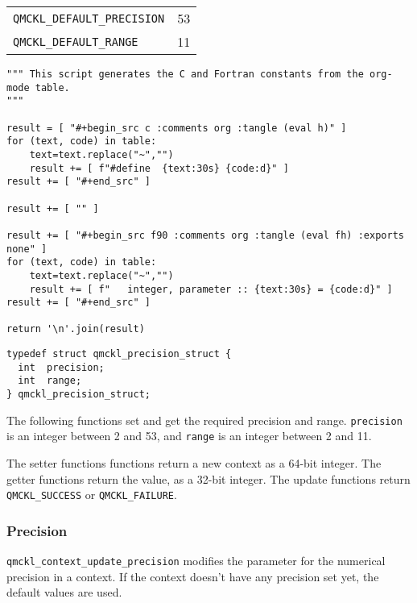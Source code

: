 \begin{table}[htbp]
\label{tab:orga45f0a8}
\centering
\begin{tabular}{lr}
\texttt{QMCKL\_DEFAULT\_PRECISION} & 53\\
\texttt{QMCKL\_DEFAULT\_RANGE} & 11\\
\end{tabular}
\end{table}

\begin{verbatim}
""" This script generates the C and Fortran constants from the org-mode table.
"""

result = [ "#+begin_src c :comments org :tangle (eval h)" ]
for (text, code) in table:
    text=text.replace("~","")
    result += [ f"#define  {text:30s} {code:d}" ]
result += [ "#+end_src" ]

result += [ "" ]

result += [ "#+begin_src f90 :comments org :tangle (eval fh) :exports none" ]
for (text, code) in table:
    text=text.replace("~","")
    result += [ f"   integer, parameter :: {text:30s} = {code:d}" ]
result += [ "#+end_src" ]

return '\n'.join(result)

\end{verbatim}

\begin{verbatim}
typedef struct qmckl_precision_struct {
  int  precision;
  int  range;
} qmckl_precision_struct;
\end{verbatim}

The following functions set and get the required precision and
range. \texttt{precision} is an integer between 2 and 53, and \texttt{range} is an
integer between 2 and 11.

The setter functions functions return a new context as a 64-bit
integer. The getter functions return the value, as a 32-bit
integer. The update functions return \texttt{QMCKL\_SUCCESS} or
\texttt{QMCKL\_FAILURE}.

\subsubsection{Precision}
\label{sec:org6cf253c}
\texttt{qmckl\_context\_update\_precision} modifies the parameter for the
numerical precision in a context. If the context doesn't have any
precision set yet, the default values are used.

